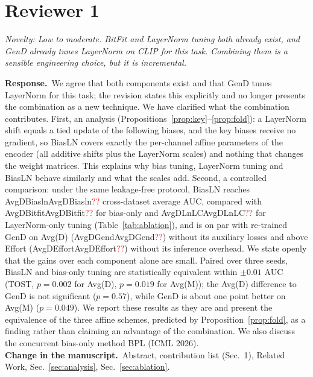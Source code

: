 \documentclass[11pt]{article}
\newcommand{\num}[1]{\ifcsname #1\endcsname\csname #1\endcsname\else\textcolor{red}{??}\fi}
\newenvironment{comment}{\par\medskip\noindent\begin{minipage}{\linewidth}\color{black!70}\itshape}{\end{minipage}\par\smallskip}
\newcommand{\resp}{\noindent\textbf{Response.}~}
\newcommand{\change}{\noindent\textbf{Change in the manuscript.}~}
\begin{document}
\section*{Reviewer 1}

\begin{comment}
Novelty: Low to moderate. BitFit and LayerNorm tuning both already exist, and GenD already tunes LayerNorm on CLIP for this task. Combining them is a sensible engineering choice, but it is incremental.
\end{comment}
\resp We agree that both components exist and that GenD tunes LayerNorm for this task; the revision states this explicitly and no longer presents the combination as a new technique. We have clarified what the combination contributes. First, an analysis (Propositions~\ref{prop:key}--\ref{prop:fold}): a LayerNorm shift equals a tied update of the following biases, and the key biases receive no gradient, so BiasLN covers exactly the per-channel affine parameters of the encoder (all additive shifts plus the LayerNorm scales) and nothing that changes the weight matrices. This explains why bias tuning, LayerNorm tuning and BiasLN behave similarly and what the scales add. Second, a controlled comparison: under the same leakage-free protocol, BiasLN reaches \num{AvgDBiasln} cross-dataset average AUC, compared with \num{AvgDBitfit} for bias-only and \num{AvgDLnLC} for LayerNorm-only tuning (Table~\ref{tab:ablation}), and is on par with re-trained GenD on Avg(D) (\num{AvgDGend}) without its auxiliary losses and above Effort (\num{AvgDEffort}) without its inference overhead. We state openly that the gains over each component alone are small. Paired over three seeds, BiasLN and bias-only tuning are statistically equivalent within $\pm0.01$ AUC (TOST, $p=0.002$ for Avg(D), $p=0.019$ for Avg(M)); the Avg(D) difference to GenD is not significant ($p=0.57$), while GenD is about one point better on Avg(M) ($p=0.049$). We report these results as they are and present the equivalence of the three affine schemes, predicted by Proposition~\ref{prop:fold}, as a finding rather than claiming an advantage of the combination. We also discuss the concurrent bias-only method BPL (ICML 2026).\\
\change Abstract, contribution list (Sec.~1), Related Work, Sec.~\ref{sec:analysis}, Sec.~\ref{sec:ablation}.
\end{document}
